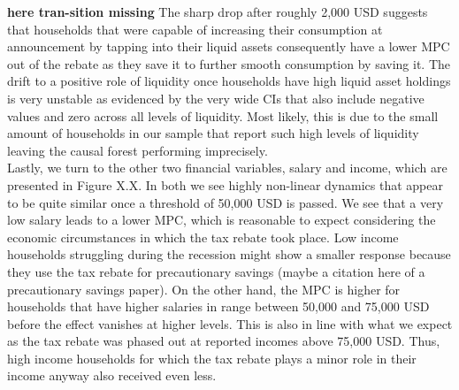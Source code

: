 \textbf{here tran-sition missing} The sharp drop after roughly 2,000 USD suggests that households that were capable of increasing their consumption at announcement by tapping into their liquid assets consequently have a lower MPC out of the rebate as they save it to further smooth consumption by saving it. The drift to a positive role of liquidity once households have high liquid asset holdings is very unstable as evidenced by the very wide CIs that also include negative values and zero across all levels of liquidity. Most likely, this is due to the small amount of households in our sample that report such high levels of liquidity leaving the causal forest performing imprecisely. \\
Lastly, we turn to the other two financial variables, salary and income, which are presented in Figure X.X. In both we see highly non-linear dynamics that appear to be quite similar once a threshold of 50,000 USD is passed. We see that a very low salary leads to a lower MPC, which is reasonable to expect considering the economic circumstances in which the tax rebate took place. Low income households struggling during the recession might show a smaller response because they use the tax rebate for precautionary savings (maybe a citation here of a precautionary savings paper). On the other hand, the MPC is higher for households that have higher salaries in range between 50,000 and 75,000 USD before the effect vanishes at higher levels. This is also in line with what we expect as the tax rebate was phased out at reported incomes above 75,000 USD. Thus, high income households for which the tax rebate plays a minor role in their income anyway also received even less. 